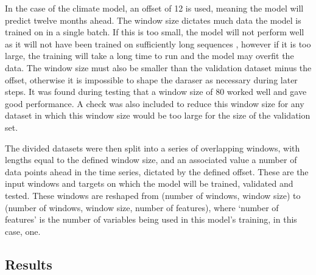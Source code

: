 \documentclass[12pt]{article}
\begin{document}
In the case of the climate model, an offset of 12 is used, meaning the model will predict twelve months ahead. The window size dictates much data 
the model is trained on in a single batch. If this is too small, the model will not perform well as it will not have been trained on sufficiently 
long sequences , however if it is too large, the training will take a long time to run and the model may overfit the data. The window size must
 also be smaller than the validation dataset minus the offset, otherwise it is impossible to shape the daraser as necessary during later steps. 
 It was found during testing that a window size of 80 worked well and gave good performance. A check was also included to reduce this window size
  for any dataset in which this window size would be too large for the size of the validation set.

The divided datasets were then split into a series of overlapping windows, with lengths equal to the defined window size, and an associated value
 a number of data points ahead in the time series, dictated by the defined offset. These are the input windows and targets on which the model will
  be trained, validated and tested. These windows are reshaped from (number of windows, window size) to (number of windows, window size, number 
  of features), where ‘number of features’ is the number of variables being used in this model’s training, in this case, one.

\subsection{Results}
\end{document}
